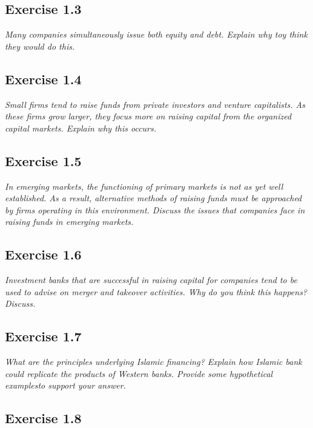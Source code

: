 \documentclass[]{book}
\theoremstyle{definition}
\theoremstyle{definition}
\theoremstyle{remark}
\begin{document}
\subsection{Exercise 1.3}\label{exercise-1.3}

\emph{Many companies simultaneously issue both equity and debt. Explain
why toy think they would do this.} \citep[p.26]{book}

\subsection{Exercise 1.4}\label{exercise-1.4}

\emph{Small firms tend to raise funds from private investors and venture
capitalists. As these firms grow larger, they focus more on raising
capital from the organized capital markets. Explain why this occurs.}
\citep[p.26]{book}

\subsection{Exercise 1.5}\label{exercise-1.5}

\emph{In emerging markets, the functioning of primary markets is not as
yet well established. As a result, alternative methods of raising funds
must be approached by firms operating in this environment. Discuss the
issues that companies face in raising funds in emerging markets.}
\citep[p.26]{book}

\subsection{Exercise 1.6}\label{exercise-1.6}

\emph{Investment banks that are successful in raising capital for
companies tend to be used to advise on merger and takeover activities.
Why do you think this happens? Discuss.} \citep[p.26]{book}

\subsection{Exercise 1.7}\label{exercise-1.7}

\emph{What are the principles underlying Islamic financing? Explain how
Islamic bank could replicate the products of Western banks. Provide some
hypothetical examplesto support your answer.} \citep[p.26]{book}

\subsection{Exercise 1.8}\label{exercise-1.8}
\end{document}
